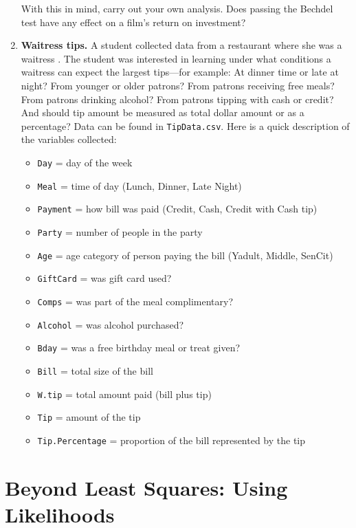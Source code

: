 \documentclass[
]{krantz}
\providecommand{\tightlist}{%
  \setlength{\itemsep}{0pt}\setlength{\parskip}{0pt}}
\begin{document}
\begin{enumerate}
  With this in mind, carry out your own analysis. Does passing the Bechdel test have any effect on a film's return on investment?
\item
  \textbf{Waitress tips.} A student collected data from a restaurant where she was a waitress \citep{Dahlquist2011}. The student was interested in learning under what conditions a waitress can expect the largest tips---for example: At dinner time or late at night? From younger or older patrons? From patrons receiving free meals? From patrons drinking alcohol? From patrons tipping with cash or credit? And should tip amount be measured as total dollar amount or as a percentage? Data can be found in \texttt{TipData.csv}. Here is a quick description of the variables collected:

  \begin{itemize}
  \tightlist
  \item
    \texttt{Day} = day of the week
  \item
    \texttt{Meal} = time of day (Lunch, Dinner, Late Night)
  \item
    \texttt{Payment} = how bill was paid (Credit, Cash, Credit with Cash tip)
  \item
    \texttt{Party} = number of people in the party
  \item
    \texttt{Age} = age category of person paying the bill (Yadult, Middle, SenCit)
  \item
    \texttt{GiftCard} = was gift card used?
  \item
    \texttt{Comps} = was part of the meal complimentary?
  \item
    \texttt{Alcohol} = was alcohol purchased?
  \item
    \texttt{Bday} = was a free birthday meal or treat given?
  \item
    \texttt{Bill} = total size of the bill
  \item
    \texttt{W.tip} = total amount paid (bill plus tip)
  \item
    \texttt{Tip} = amount of the tip
  \item
    \texttt{Tip.Percentage} = proportion of the bill represented by the tip
  \end{itemize}
\end{enumerate}

\chapter{Beyond Least Squares: Using Likelihoods}\label{ch-beyondmost}
\end{document}
